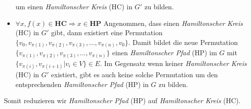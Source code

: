 \documentclass{article}
\begin{document}
\begin{flushleft}
\begin{itemize}
    um einen \emph{Hamiltonscher Kreis} (HC) in $G'$ zu bilden.
    \item $\forall x, f(x) \in \textbf{HC} \Longrightarrow x \in \textbf{HP}$
    \newline
    Angenommen, dass einen \emph{Hamiltonscher Kreis} (HC) in $G'$ gibt, dann existiert eine Permutation
    $\{v_0, v_{\pi(1)},v_{\pi(2)},v_{\pi(3)},\dots,v_{\pi(n)}, v_0\}$. Damit bildet die neue Permutation $\{v_{\pi(1)},v_{\pi(2)},
    v_{\pi(3)},\dots,v_{\pi(n)}\}$ einen \emph{Hamiltonscher Pfad} (HP) im $G$ mit $\{v_{\pi(i)},v_{\pi(i+1)}|v_i \in V\} \in E$.
    Im Gegensatz wenn keiner \emph{Hamiltonscher Kreis} (HC) in $G'$ existiert, gibt es auch keine solche Permutation um den entsprechenden 
    \emph{Hamiltonscher Pfad} (HP) in $G$ zu bilden.
\end{itemize}
Somit reduzieren wir \emph{Hamiltonscher Pfad} (HP) auf \emph{Hamiltonscher Kreis} (HC).
\end{flushleft}
\end{document}
